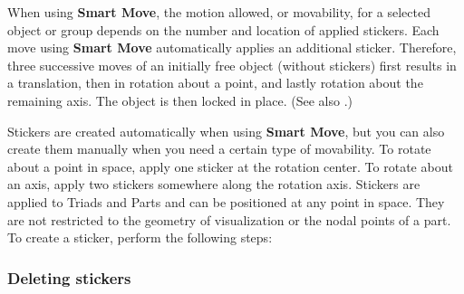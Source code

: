 When using \textbf{Smart Move}, the motion allowed, or movability, for a
selected object or group depends on the number and location of applied stickers.
Each move using \textbf{Smart Move} automatically applies an additional sticker.
Therefore, three successive moves of an initially free object (without stickers)
first results in a translation, then in rotation about a point, and lastly
rotation about the remaining axis. The object is then locked in place.
(See also .)



Stickers are created automatically when using \textbf{Smart Move}, but you can
also create them manually when you need a certain type of movability.
To rotate about a point in space, apply one sticker at the rotation center.
To rotate about an axis, apply two stickers somewhere along the rotation axis.
Stickers are applied to Triads and Parts and can be positioned at any point in
space. They are not restricted to the geometry of visualization or the nodal
points of a part. To create a sticker, perform the following steps:


\subsubsection{Deleting stickers}


